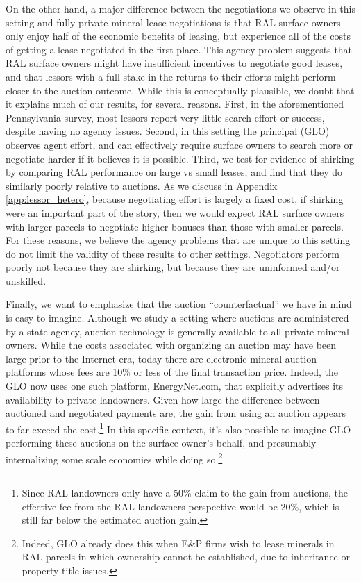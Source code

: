 On the other hand, a major difference between the negotiations we observe in this setting and fully private mineral lease negotiations is that RAL surface owners only enjoy half of the economic benefits of leasing, but experience all of the costs of getting a lease negotiated in the first place. This agency problem suggests that RAL surface owners might have insufficient incentives to negotiate good leases, and that lessors with a full stake in the returns to their efforts might perform closer to the auction outcome. While this is conceptually plausible, we doubt that it explains much of our results, for several reasons. First, in the aforementioned Pennsylvania survey, most lessors report very little search effort or success, despite having no agency issues. Second, in this setting the principal (GLO) observes agent effort, and can effectively require surface owners to search more or negotiate harder if it believes it is possible. Third, we test for evidence of shirking by comparing RAL performance on large vs small leases, and find that they do similarly poorly relative to auctions. As we discuss in Appendix \ref{app:lessor_hetero}, because negotiating effort is largely a fixed cost, if shirking were an important part of the story, then we would expect RAL surface owners with larger parcels to negotiate higher bonuses than those with smaller parcels. For these reasons, we believe the agency problems that are unique to this setting do not limit the validity of these results to other settings. Negotiators perform poorly not because they are shirking, but because they are uninformed and/or unskilled. 

Finally, we want to emphasize that the auction ``counterfactual'' we have in mind is easy to imagine. Although we study a setting where auctions are administered by a state agency, auction technology is generally available to all private mineral owners. While the costs associated with organizing an auction may have been large prior to the Internet era, today there are electronic mineral auction platforms whose fees are 10\% or less of the final transaction price.  Indeed, the  GLO now uses one such platform, EnergyNet.com, that explicitly advertises its availability to private landowners.  Given how large the difference between auctioned and negotiated payments are, the gain from using an auction appears to far exceed the cost.\footnote{Since RAL landowners only have a 50\% claim to the gain from auctions, the effective fee from the RAL landowners perspective would be 20\%, which is still far below the estimated auction gain.} In this specific context, it's also possible to imagine GLO performing these auctions on the surface owner's behalf, and presumably internalizing some scale economies while doing so.\footnote{Indeed, GLO already does this when E\&P firms wish to lease minerals in RAL parcels in which ownership cannot be established, due to inheritance or property title issues.} 

